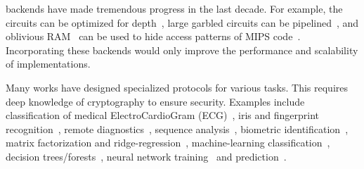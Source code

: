 \mpc backends  have made  tremendous progress in the last decade.
For example, the circuits can be optimized for depth~\cite{ddkssz15,cbmcgcdepth}, large garbled circuits can be pipelined~\cite{yao-pipe,oblivm}, and oblivious RAM~\cite{oram1,oram2} can be used to hide access patterns of MIPS code~\cite{mips}. Incorporating these backends would only improve the performance and scalability of \tool implementations.

Many works have designed specialized protocols for various \mpc tasks. 
This requires deep knowledge of cryptography
to ensure security.
Examples include classification of medical ElectroCardioGram (ECG)~\cite{barni}, iris and fingerprint recognition~\cite{blanton}, remote diagnostics~\cite{brickell}, sequence analysis~\cite{franz}, biometric identification~\cite{huang}, matrix factorization and ridge-regression~\cite{valeriaMatrix, valeriaRidge}, machine-learning classification~\cite{shafindss}, decision trees/forests~\cite{wu}, neural network training~\cite{secureml} and prediction~\cite{minionn}.

